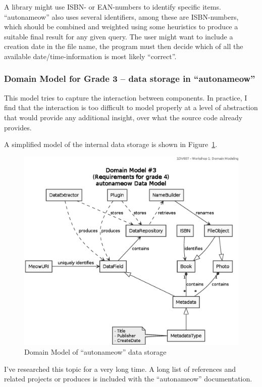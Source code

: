 A library might use ISBN- or EAN-numbers to identify specific items.
``autonameow'' also uses several identifiers, among these are ISBN-numbers,
which should be combined and weighted using some heuristics to produce a
suitable final result for any given query.
The user might want to include a creation date in the file name, the program
must then decide which of all the available date/time-information is most
likely ``correct''.


\subsubsection{Domain Model for Grade 3 -- data storage in ``autonameow''}
This model tries to capture the interaction between components. In practice, I
find that the interaction is too difficult to model properly at a level of
abstraction that would provide any additional insight, over what the source
code already provides.

A simplified model of the internal data storage is shown in
Figure~\ref{fig:uml-domain3b}.


\begin{figure}[htbp]
  \centering
  \includegraphics[width=\linewidth]{uml/domain-model_3b.eps}
  \caption{Domain Model of ``autonameow'' data storage}
  \label{fig:uml-domain3b}
\end{figure}

I've researched this topic for a very long time. A long list of references and
related projects or produces is included with the ``autonameow''
documentation\cite{js:autonameow-docs}.

